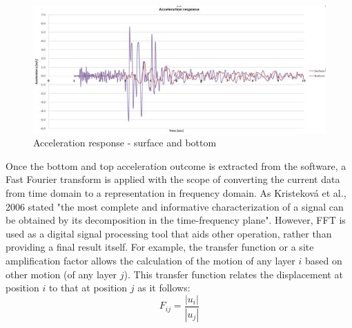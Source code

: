 	\begin{figure}[h!]
		\centering
		\includegraphics[width=0.7\linewidth]{"acc_response2"}
		\caption{Acceleration response - surface and bottom}
		\label{acc_resp2}
	\end{figure}
	Once the bottom and top acceleration outcome is extracted from the software, a Fast Fourier transform is applied with the scope of converting the current data from time domain to a representation in frequency domain. As Kristeková et al., 2006 \cite{kristekova2006misfit} stated "the most complete and informative characterization of a signal can be obtained by its decomposition in the time-frequency plane". However, FFT is used as a digital signal processing tool that aids other operation, rather than providing a final result itself. For example, the transfer function or a site amplification factor allows the calculation of the motion of any layer $i$ based on other motion (of any layer $j$). This transfer function relates the displacement at position $i$ to that at position $j$ as it follows:
	\begin{equation}
	F_{ij}=\frac{|u_i|}{|u_j|}
	\end{equation}
	
